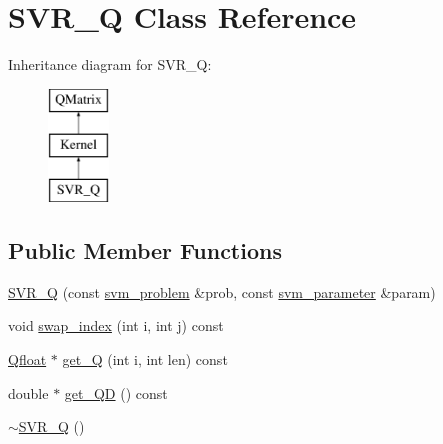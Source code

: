 \hypertarget{classSVR__Q}{}\section{S\+V\+R\+\_\+Q Class Reference}
\label{classSVR__Q}
Inheritance diagram for S\+V\+R\+\_\+Q\+:\begin{figure}[H]
\begin{center}
\leavevmode
\includegraphics[height=3.000000cm]{classSVR__Q}
\end{center}
\end{figure}
\subsection*{Public Member Functions}
\begin{DoxyCompactItemize}
\item 
\hyperlink{classSVR__Q_a348978e0cce4c0bf503dc825241eb4ff}{S\+V\+R\+\_\+Q} (const \hyperlink{structsvm__problem}{svm\+\_\+problem} \&prob, const \hyperlink{structsvm__parameter}{svm\+\_\+parameter} \&param)
\item 
void \hyperlink{classSVR__Q_a9d3884f0c68f4ce18d47570e4a203405}{swap\+\_\+index} (int i, int j) const 
\item 
\hyperlink{svm__core_8cpp_a8755d90a54ecfb8d15051af3e0542592}{Qfloat} $\ast$ \hyperlink{classSVR__Q_aba55078d17e7815f093ffa154f3cee9d}{get\+\_\+Q} (int i, int len) const 
\item 
double $\ast$ \hyperlink{classSVR__Q_ac22ed5ce1b0bf6a900c3c8d631e77d76}{get\+\_\+\+QD} () const 
\item 
\hyperlink{classSVR__Q_a2a8efdc1fef68cc5bc9d0d2669d24e36}{$\sim$\+S\+V\+R\+\_\+Q} ()
\end{DoxyCompactItemize}
